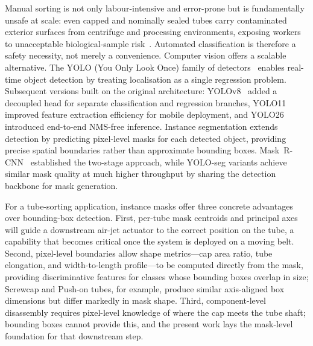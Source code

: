 \documentclass{Academic}
\begin{document}
Manual sorting is not only labour-intensive and error-prone but is fundamentally unsafe at scale: even capped and nominally sealed tubes carry contaminated exterior surfaces from centrifuge and processing environments, exposing workers to unacceptable biological-sample risk~\supercite{chartier2014safe}. Automated classification is therefore a safety necessity, not merely a convenience. Computer vision offers a scalable alternative. The YOLO (You Only Look Once) family of detectors~\supercite{redmon2016yolo} enables real-time object detection by treating localisation as a single regression problem. Subsequent versions built on the original architecture: YOLOv8~\supercite{jocher2023yolov8} added a decoupled head for separate classification and regression branches, YOLO11~\supercite{jocher2024yolo11} improved feature extraction efficiency for mobile deployment, and YOLO26 introduced end-to-end NMS-free inference. Instance segmentation extends detection by predicting pixel-level masks for each detected object, providing precise spatial boundaries rather than approximate bounding boxes. Mask~R-CNN~\supercite{he2017maskrcnn} established the two-stage approach, while YOLO-seg variants achieve similar mask quality at much higher throughput by sharing the detection backbone for mask generation.

For a tube-sorting application, instance masks offer three concrete advantages over bounding-box detection. First, per-tube mask centroids and principal axes will guide a downstream air-jet actuator to the correct position on the tube, a capability that becomes critical once the system is deployed on a moving belt. Second, pixel-level boundaries allow shape metrics---cap area ratio, tube elongation, and width-to-length profile---to be computed directly from the mask, providing discriminative features for classes whose bounding boxes overlap in size; Screwcap and Push-on tubes, for example, produce similar axis-aligned box dimensions but differ markedly in mask shape. Third, component-level disassembly requires pixel-level knowledge of where the cap meets the tube shaft; bounding boxes cannot provide this, and the present work lays the mask-level foundation for that downstream step.
\end{document}
